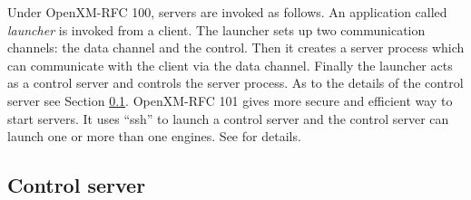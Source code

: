 Under OpenXM-RFC 100, servers are invoked as follows.
An application called {\it launcher} is invoked from a client.
The launcher sets up two communication channels: the data channel 
and the control. Then it creates a server process which can communicate
with the client via the data channel. Finally the launcher
acts as a control server and controls the server process.
As to the details of the control server see Section \ref{control}.
OpenXM-RFC 101 \cite{ox-rfc-101} gives more secure and
efficient way to start servers.
It uses ``ssh'' to launch a control server and 
the control server can launch one or more than one
engines.
See \cite{ox-rfc-101} for details.

\subsection{Control server}
\label{control}
%
%

